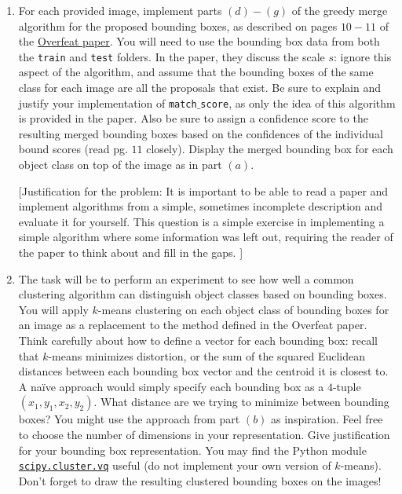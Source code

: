 \documentclass[12pt]{article}
\begin{document}
\begin{enumerate}
\item For each provided image, implement parts $(d)-(g)$ of the greedy merge algorithm for the proposed bounding boxes, as described on pages $10-11$ of the \href{http://arxiv.org/pdf/1312.6229v4.pdf}{Overfeat paper}. You will need to use the bounding box data from both the \texttt{train} and \texttt{test} folders. In the paper, they discuss the scale $s$: ignore this aspect of the algorithm, and assume that the bounding boxes of the same class for each image are all the proposals that exist. Be sure to explain and justify your implementation of \texttt{match$\_$score}, as only the idea of this algorithm is provided in the paper. Also be sure to assign a confidence score to the resulting merged bounding boxes based on the confidences of the individual bound scores (read pg. $11$ closely). Display the merged bounding box for each object class on top of the image as in part $(a)$.

[Justification for the problem: It is important to be able to read a paper and implement algorithms from a simple, sometimes incomplete description and evaluate it for yourself. This question is a simple exercise in implementing a simple algorithm where some information was left out, requiring the reader of the paper to think about and fill in the gaps. ]

\item The task will be to perform an experiment to see how well a common clustering algorithm can distinguish object classes based on bounding boxes. You will apply $k$-means clustering on each object class of bounding boxes for an image as a replacement to the method defined in the Overfeat paper. Think carefully about how to define a vector for each bounding box: recall that $k$-means minimizes distortion, or the sum of the squared Euclidean distances between each bounding box vector and the centroid it is closest to. A na{\"i}ve approach would simply specify each bounding box as a $4$-tuple $(x_1, y_1, x_2, y_2)$. What distance are we trying to minimize between bounding boxes? You might use the approach from part $(b)$ as inspiration. Feel free to choose the number of dimensions in your representation. Give justification for your bounding box representation. You may find the Python module \href{http://docs.scipy.org/doc/scipy/reference/cluster.vq.html}{\texttt{scipy.cluster.vq}} useful (do not implement your own version of $k$-means). Don't forget to draw the resulting clustered bounding boxes on the images!


\end{enumerate}
\end{document}
